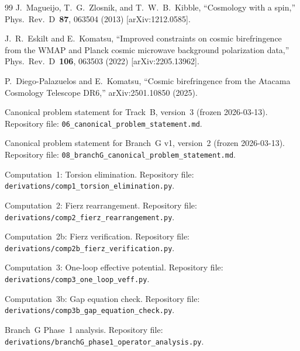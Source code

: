 \documentclass[11pt,letterpaper]{article}
\begin{document}
\begin{thebibliography}{99}
J.~Magueijo, T.~G.~Zlosnik, and T.~W.~B.~Kibble,
``Cosmology with a spin,''
Phys.\ Rev.\ D~\textbf{87}, 063504 (2013)
[arXiv:1212.0585].

J.~R.~Eskilt and E.~Komatsu,
``Improved constraints on cosmic birefringence from the WMAP and
Planck cosmic microwave background polarization data,''
Phys.\ Rev.\ D~\textbf{106}, 063503 (2022)
[arXiv:2205.13962].

P.~Diego-Palazuelos and E.~Komatsu,
``Cosmic birefringence from the Atacama Cosmology Telescope DR6,''
arXiv:2501.10850 (2025).

Canonical problem statement for Track~B, version~3 (frozen 2026-03-13).
Repository file: \texttt{06\_canonical\_problem\_statement.md}.

Canonical problem statement for Branch~G v1, version~2 (frozen 2026-03-13).
Repository file: \texttt{08\_branchG\_canonical\_problem\_statement.md}.

Computation~1: Torsion elimination.
Repository file: \texttt{derivations/comp1\_torsion\_elimination.py}.

Computation~2: Fierz rearrangement.
Repository file: \texttt{derivations/comp2\_fierz\_rearrangement.py}.

Computation~2b: Fierz verification.
Repository file: \texttt{derivations/comp2b\_fierz\_verification.py}.

Computation~3: One-loop effective potential.
Repository file: \texttt{derivations/comp3\_one\_loop\_veff.py}.

Computation~3b: Gap equation check.
Repository file: \texttt{derivations/comp3b\_gap\_equation\_check.py}.

Branch~G Phase~1 analysis.
Repository file: \texttt{derivations/branchG\_phase1\_operator\_analysis.py}.

\end{thebibliography}
\end{document}
